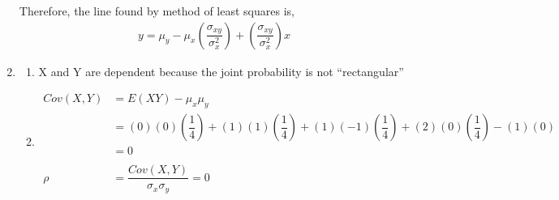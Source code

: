 \documentclass{article}
\newcommand\mfrac[2]{\left(\dfrac{#1}{#2}\right)}
\begin{document}
\begin{enumerate}
      Therefore, the line found by method of least squares is,
      \begin{align*}
       y = \mu_y - \mu_x\mfrac{\sigma_{xy}}{\sigma_x^2} + \mfrac{\sigma_{xy}}{\sigma_x^2}x
      \end{align*}
     \addtocounter{enumi}{1}
     
     \item
      \begin{enumerate}
       \item
	X and Y are dependent because the joint probability is not ``rectangular''
       
       \item
	\begin{align*}
	  Cov(X,Y) &= E(XY) - \mu_x\mu_y \\
	    &= (0)(0)\mfrac{1}{4} + (1)(1)\mfrac{1}{4} + (1)(-1)\mfrac{1}{4} + (2)(0)\mfrac{1}{4} 
	      - (1)(0) \\ 
	    &= 0 \\
	    \\
	  \rho &= \dfrac{Cov(X,Y)}{\sigma_x \sigma_y} = 0
	\end{align*}
      \end{enumerate}
    \end{enumerate}
\end{document}
